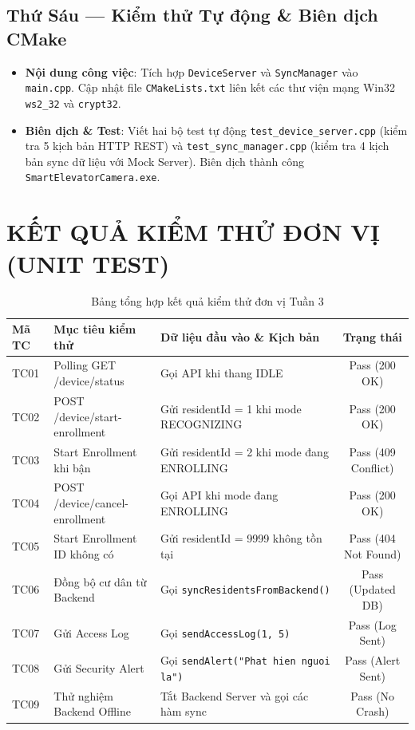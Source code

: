 \documentclass[12pt,a4paper]{article}
\begin{document}
\subsection{Thứ Sáu — Kiểm thử Tự động \& Biên dịch CMake}
\begin{itemize}
    \item \textbf{Nội dung công việc}: Tích hợp \texttt{DeviceServer} và \texttt{SyncManager} vào \texttt{main.cpp}. Cập nhật file \texttt{CMakeLists.txt} liên kết các thư viện mạng Win32 \texttt{ws2\_32} và \texttt{crypt32}.
    \item \textbf{Biên dịch & Test}: Viết hai bộ test tự động \texttt{test\_device\_server.cpp} (kiểm tra 5 kịch bản HTTP REST) và \texttt{test\_sync\_manager.cpp} (kiểm tra 4 kịch bản sync dữ liệu với Mock Server). Biên dịch thành công \texttt{SmartElevatorCamera.exe}.
\end{itemize}

\newpage

\section{KẾT QUẢ KIỂM THỬ ĐƠN VỊ (UNIT TEST)}

\begin{table}[H]
\centering
\small
\begin{tabularx}{\textwidth}{|l|X|X|c|}
\hline
\textbf{Mã TC} & \textbf{Mục tiêu kiểm thử} & \textbf{Dữ liệu đầu vào \& Kịch bản} & \textbf{Trạng thái} \\ \hline
TC01 & Polling GET /device/status & Gọi API khi thang IDLE & Pass (200 OK) \\ \hline
TC02 & POST /device/start-enrollment & Gửi residentId = 1 khi mode RECOGNIZING & Pass (200 OK) \\ \hline
TC03 & Start Enrollment khi bận & Gửi residentId = 2 khi mode đang ENROLLING & Pass (409 Conflict) \\ \hline
TC04 & POST /device/cancel-enrollment & Gọi API khi mode đang ENROLLING & Pass (200 OK) \\ \hline
TC05 & Start Enrollment ID không có & Gửi residentId = 9999 không tồn tại & Pass (404 Not Found) \\ \hline
TC06 & Đồng bộ cư dân từ Backend & Gọi \texttt{syncResidentsFromBackend()} & Pass (Updated DB) \\ \hline
TC07 & Gửi Access Log & Gọi \texttt{sendAccessLog(1, 5)} & Pass (Log Sent) \\ \hline
TC08 & Gửi Security Alert & Gọi \texttt{sendAlert("Phat hien nguoi la")} & Pass (Alert Sent) \\ \hline
TC09 & Thử nghiệm Backend Offline & Tắt Backend Server và gọi các hàm sync & Pass (No Crash) \\ \hline
\end{tabularx}
\caption{Bảng tổng hợp kết quả kiểm thử đơn vị Tuần 3}
\end{table}
\end{document}

